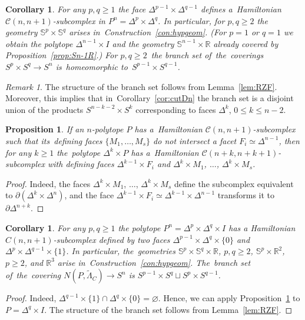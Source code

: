 \documentclass[12pt]{amsart}
\newtheorem{proposition}[formula]{Proposition}
\newtheorem{corollary}[formula]{Corollary}
\theoremstyle{definition}
\theoremstyle{remark}
\newtheorem{remark}[formula]{Remark}
\begin{document}
\begin{corollary}\label{cor:spsq}
For any $p,q\geqslant 1$ the face $\Delta^{p-1}\times\Delta^{q-1}$ defines a~Hamiltonian
$\mathcal{C}(n,n+1)$-subcomplex in $P^n=\Delta^p\times\Delta^q$. In particular, for $p,q\geqslant 2$
the geometry $\mathbb S^p\times \mathbb S^q$ arises in~Construction~\ref{con:hypgeom}.
(For $p=1$ or $q=1$ we obtain the polytope $\Delta^{n-1}\times I$ and the geometry $\mathbb S^{n-1}\times\mathbb R$
already covered by Proposition~\ref{prop:Sn-1R}.) 
For $p,q\geqslant 2$~the branch set of~the~coverings $S^p\times S^q\to S^n$ 
is~homeomorphic to~$S^{p-1}\times S^{q-1}$. 
\end{corollary}
\begin{remark}
The structure of the branch set follows from Lemma~\ref{lem:RZF}. Moreover, 
this implies that in~Corollary~\ref{cor:cutDn} the branch set is a disjoint union of the products $S^{n-k-2}\times S^k$
corresponding to faces $\Delta^k$, $0\leqslant k\leqslant n-2$.
\end{remark}
\begin{proposition}\label{prop:Dn-1}
If an $n$-polytope $P$ has a~Hamiltonian $\mathcal{C}(n,n+1)$-subcomplex such
that its~defining faces $\{M_1,\dots, M_s\}$ do not intersect a facet $F_i\simeq \Delta^{n-1}$,
then for any $k\geqslant 1$ the~polytope $\Delta^k\times P$ has a~Hamiltonian 
$\mathcal{C}(n+k,n+k+1)$-subcomplex with defining faces $\Delta^{k-1}\times F_i$ and $\Delta^k\times M_1$,
$\dots$, $\Delta^k\times M_s$. 
\end{proposition}
\begin{proof}
Indeed, the faces  $\Delta^k\times M_1$,
$\dots$, $\Delta^k\times M_s$ define the subcomplex equivalent to $\partial (\Delta^k\times \Delta^n)$,
and the face $\Delta^{k-1}\times F_i\simeq \Delta^{k-1}\times\Delta^{n-1}$ transforms it to $\partial \Delta^{n+k}$.
\end{proof}
\begin{corollary}\label{cor:pqI}
For any $p,q\geqslant 1$ the polytope $P^n=\Delta^p\times\Delta^q\times I$
has a Hamiltonian $C(n, n+1)$-subcomplex defined by two faces $\Delta^{p-1}\times\Delta^q\times \{0\}$
and $\Delta^p\times\Delta^{q-1}\times \{1\}$. 
In particular, the~geometries $\mathbb S^p\times \mathbb S^q\times \mathbb R$, $p,q\geqslant 2$, 
$\mathbb S^p\times \mathbb R^2$, $p\geqslant 2$, and $\mathbb R^3$ arise in~Construction~\ref{con:hypgeom}.
The~branch set of~the~covering  $N(P,\widetilde{\Lambda}_C)\to S^n$ is  $S^{p-1}\times S^q\sqcup S^p\times S^{q-1}$.
\end{corollary}
\begin{proof}
Indeed, $\Delta^{q-1}\times\{1\}\cap \Delta^q\times \{0\}=\varnothing$. Hence, we can apply Proposition~\ref{prop:Dn-1}
to $P=\Delta^q\times I$. The structure of the branch set follows from Lemma~\ref{lem:RZF}.
\end{proof}
\end{document}
